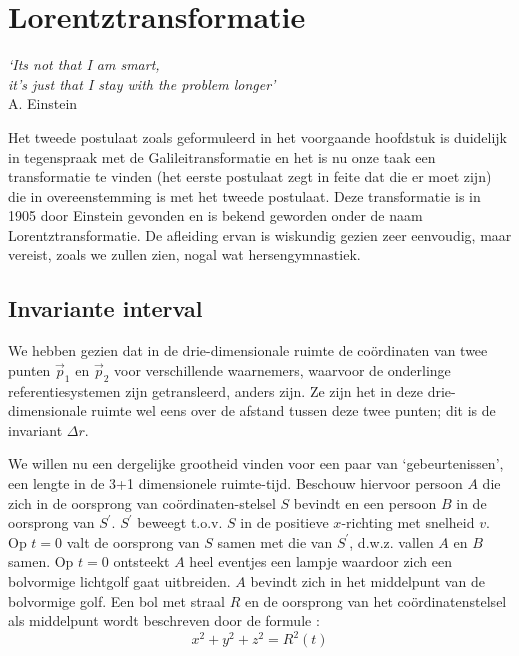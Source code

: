 \chapter{Lorentztransformatie}
\vspace{-1cm}\begin{flushright}
{\it `Its not that I am smart, \\it's just that I stay with the problem longer'}\\ A. Einstein
\end{flushright}

Het tweede postulaat zoals geformuleerd in het voorgaande hoofdstuk is
duidelijk in tegenspraak met de Galileitransformatie en het is nu onze
taak een transformatie te vinden (het eerste postulaat zegt in feite
dat die er moet zijn) die in overeenstemming is met het tweede
postulaat.  Deze transformatie is in 1905 door Einstein gevonden en is
bekend geworden onder de naam Lorentztransformatie.  De afleiding
ervan is wiskundig gezien zeer eenvoudig, maar vereist, zoals we
zullen zien, nogal wat hersengymnastiek.

\section{Invariante interval}
We hebben gezien dat in de drie-dimensionale ruimte de co\"ordinaten van
twee punten $\vec{p}_1$ en $\vec{p}_2$ voor verschillende waarnemers,
waarvoor de onderlinge referentiesystemen zijn getransleerd, anders
zijn. Ze zijn het in deze drie-dimensionale ruimte wel eens over de
afstand tussen deze twee punten; dit is de invariant $\Delta r$.

We willen nu een dergelijke grootheid vinden voor een paar van `gebeurtenissen', een lengte in
de 3+1 dimensionele ruimte-tijd. Beschouw hiervoor persoon
$A$ die zich in de oorsprong van co\"{o}rdinaten-stelsel $S$ bevindt en
een persoon $B$ in de oorsprong van $S^{'}$.  $S^{'}$ beweegt
t.o.v. $S$ in de positieve $x$-richting met snelheid $v$.  Op $t=0$
valt de oorsprong van $S$ samen met die van $S^{'}$, d.w.z. vallen $A$
en $B$ samen.  Op $t=0$ ontsteekt $A$ heel eventjes een lampje
waardoor zich een bolvormige lichtgolf gaat uitbreiden.  $A$ bevindt
zich in het middelpunt van de bolvormige golf.  Een bol met straal $R$
en de oorsprong van het co\"{o}rdinatenstelsel als middelpunt wordt
beschreven door de formule :
\begin{displaymath}
x^{2} + y^{2} + z^{2} = R^{2}(t)
\end{displaymath}

